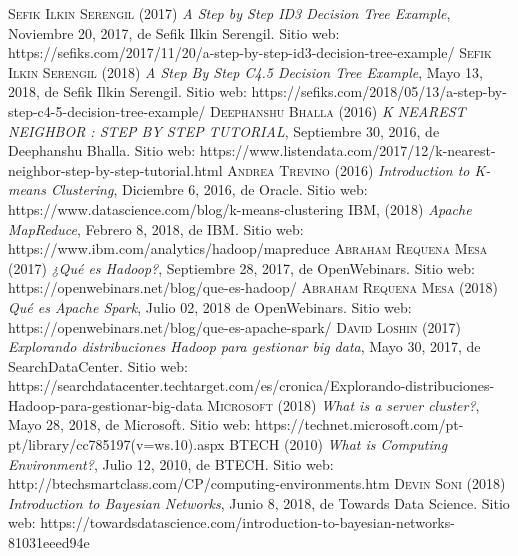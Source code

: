 \begin{thebibliography}{}
	 \textsc{Sefik Ilkin Serengil} (2017) \textit{A Step by Step ID3 Decision Tree Example}, Noviembre 20, 2017, de Sefik Ilkin Serengil. Sitio web: https://sefiks.com/2017/11/20/a-step-by-step-id3-decision-tree-example/
	 \textsc{Sefik Ilkin Serengil} (2018) \textit{A Step By Step C4.5 Decision Tree Example}, Mayo 13, 2018, de Sefik Ilkin Serengil. Sitio web: https://sefiks.com/2018/05/13/a-step-by-step-c4-5-decision-tree-example/
	 \textsc{Deephanshu Bhalla} (2016) \textit{K NEAREST NEIGHBOR : STEP BY STEP TUTORIAL}, Septiembre 30, 2016, de Deephanshu Bhalla. Sitio web: https://www.listendata.com/2017/12/k-nearest-neighbor-step-by-step-tutorial.html
	 \textsc{Andrea Trevino} (2016) \textit{Introduction to K-means Clustering}, Diciembre 6, 2016, de Oracle. Sitio web: https://www.datascience.com/blog/k-means-clustering
	 \textsc{IBM}, (2018) \textit{Apache MapReduce}, Febrero 8, 2018, de IBM. Sitio web: https://www.ibm.com/analytics/hadoop/mapreduce
	 \textsc{Abraham Requena Mesa} (2017) \textit{¿Qué es Hadoop?}, Septiembre 28, 2017, de OpenWebinars. Sitio web: https://openwebinars.net/blog/que-es-hadoop/
	 \textsc{Abraham Requena Mesa} (2018) \textit{Qué es Apache Spark}, Julio 02, 2018 de OpenWebinars. Sitio web: https://openwebinars.net/blog/que-es-apache-spark/
	 \textsc{David Loshin} (2017) \textit{Explorando distribuciones Hadoop para gestionar big data}, Mayo 30, 2017, de SearchDataCenter. Sitio web: https://searchdatacenter.techtarget.com/es/cronica/Explorando-distribuciones-Hadoop-para-gestionar-big-data
	 \textsc{Microsoft} (2018) \textit{What is a server cluster?}, Mayo 28, 2018, de Microsoft. Sitio web: https://technet.microsoft.com/pt-pt/library/cc785197(v=ws.10).aspx
	 \textsc{BTECH} (2010) \textit{What is Computing Environment?}, Julio 12, 2010, de BTECH. Sitio web: http://btechsmartclass.com/CP/computing-environments.htm
	 \textsc{Devin Soni} (2018) \textit{Introduction to Bayesian Networks}, Junio 8, 2018, de Towards Data Science. Sitio web: https://towardsdatascience.com/introduction-to-bayesian-networks-81031eeed94e
	
\end{thebibliography}
